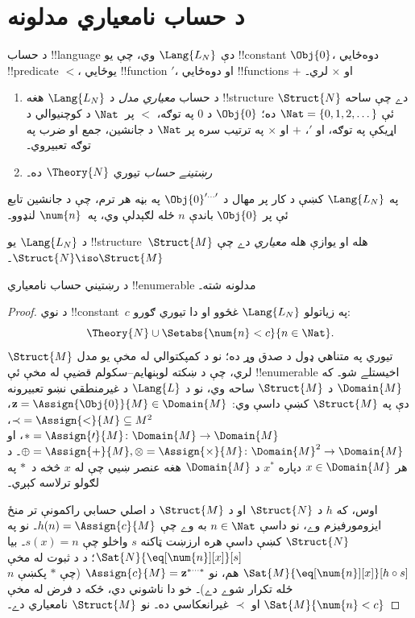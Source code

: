 \documentclass[../../../include/open-logic-section]{subfiles}
\begin{document}
\section{د حساب نامعياري مدلونه}

\begin{defn}
د حساب !!{language} دې $\Lang{L_N}$ وي، چې يو !!{constant} $\Obj{0}$، دوه‌ځايي !!{predicate} $<$، يوځايي !!{function} $\prime$، او دوه‌ځايي !!{function}s $+$ او $\times$ لري۔
\begin{enumerate}
\item د حساب \emph{معياري مدل} د $\Lang{L_N}$ هغه !!{structure} $\Struct{N}$ دے چې ساحه ئې $\Nat = \{ 0, 1, 2, \dots\}$ ده؛ $\Obj{0}$ د $0$ په توګه، $<$ پر~$\Nat$ د کوچنيوالي د اړيکې په توګه، او $\prime$، $+$ او $\times$ په ترتيب سره پر $\Nat$ د جانشين، جمع او ضرب په توګه تعبيروي۔
\item \emph{رښتينے حساب} تيوري $\Theory{N}$ ده۔
\end{enumerate}
\end{defn}

په $\Lang{L_N}$ کښې د کار پر مهال د $\Obj{0}^{\prime\dots\prime}$ په بڼه هر ترم، چې د جانشين تابع ئې پر $\Obj{0}$ باندې $n$ ځله لګېدلې وي، په~$\num{n}$ لنډوو۔

\begin{defn}
د $\Lang{L_N}$ يو !!{structure}~$\Struct{M}$ هله او يوازې هله \emph{معياري} دے چې $\Struct{N} \iso \Struct{M}$۔
\end{defn}

\begin{thm}
د رښتيني حساب نامعياري !!{enumerable} مدلونه شته۔
\end{thm}

\begin{proof}
د نوي !!{constant}~$c$ په زياتولو $\Lang{L_N}$ غځوو او دا تيوري ګورو:
\[
\Theory{N} \cup \Setabs{\num{n} < c}{n \in \Nat}.
\]
تيوري په متناهي ډول د صدق وړ ده؛ نو د کمپکتوالي له مخې يو مدل $\Struct{M}$ لري، چې د ښکته لوېنهايم--سکولم قضيې له مخې ئې !!{enumerable} اخيستلے شو۔ که $\Domain{M}$ د $\Struct{M}$ ساحه وي، نو د $\Lang{L}$ د غيرمنطقي نښو تعبيرونه دې په $\Struct{M}$ کښې داسې وي: $\mathbf{z} = \Assign{\Obj{0}}{M} \in \Domain{M}$، ${\prec} =
\Assign{<}{M} \subseteq M^2$، $* = \Assign{\prime}{M} \colon
\Domain{M} \to \Domain{M}$، او $\oplus = \Assign{+}{M}, \otimes =
\Assign{\times}{M} \colon \Domain{M}^2 \to \Domain{M}$۔ د هر $x
\in \Domain{M}$ دپاره $x^*$ د $\Domain{M}$ هغه عنصر ښيي چې له $x$ څخه د~$*$ په لګولو ترلاسه کېږي۔

اوس، که $h$ د $\Struct{N}$ او د $\Struct{M}$ د اصلي حسابي راکمونې تر منځ ايزومورفيزم وے، نو داسې $n \in \Nat$ به وے چې $h(n) = \Assign{c}{M}$۔ نو په $\Struct{N}$ کښې داسې هره ارزښت ټاکنه $s$ واخلو چې $s(x) = n$۔ بيا $\Sat{N}{\eq[\num{n}][x]}[s]$؛ د  د ثبوت له مخې $\Sat{M}{\eq[\num{n}][x]}[h \circ s]$ هم، نو $\Assign{c}{M} =
\mathbf{z}^{*\cdots *}$ (چې $*$ پکښې $n$ ځله تکرار شوے دے)۔ خو دا ناشوني دي، ځکه د فرض له مخې $\Sat{M}{\num{n} < c}$ او $\prec$ غيرانعکاسي ده۔ نو $\Struct{M}$ نامعياري دے۔
\end{proof}
\end{document}
